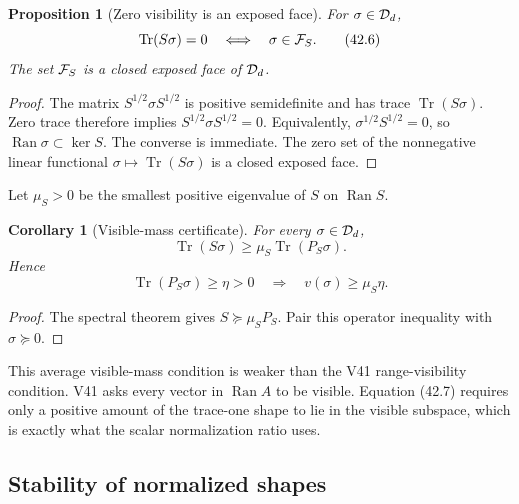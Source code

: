 \documentclass[11pt]{article}
\newtheorem{proposition}[theorem]{Proposition}
\newtheorem{corollary}[theorem]{Corollary}
\theoremstyle{remark}
\begin{document}
\begin{proposition}[Zero visibility is an exposed face]
\label{prop:v12v42-invisible-face}
For \(\sigma\in{\cal D}_d\),
\begin{equation}
 \operatorname{Tr}(S\sigma)=0
 \quad\Longleftrightarrow\quad
 \sigma\in{\cal F}_S.                             \tag{42.6}
\end{equation}
The set \({\cal F}_S\) is a closed exposed face of
\({\cal D}_d\).
\end{proposition}

\begin{proof}
The matrix \(S^{1/2}\sigma S^{1/2}\) is positive semidefinite and
has trace \(\operatorname{Tr}(S\sigma)\).  Zero trace therefore
implies
\(S^{1/2}\sigma S^{1/2}=0\).  Equivalently,
\(\sigma^{1/2}S^{1/2}=0\), so
\(\operatorname{Ran}\sigma\subset\ker S\).  The converse is
immediate.  The zero set of the nonnegative linear functional
\(\sigma\mapsto\operatorname{Tr}(S\sigma)\) is a closed exposed
face.
\end{proof}

Let \(\mu_S>0\) be the smallest positive eigenvalue of \(S\) on
\(\operatorname{Ran}S\).

\begin{corollary}[Visible-mass certificate]
\label{cor:v12v42-visible-mass}
For every \(\sigma\in{\cal D}_d\),
\begin{equation}
 \operatorname{Tr}(S\sigma)
 \geq
 \mu_S\operatorname{Tr}(P_S\sigma).              \tag{42.7}
\end{equation}
Hence
\[
 \operatorname{Tr}(P_S\sigma)\geq\eta>0
 \quad\Longrightarrow\quad
 v(\sigma)\geq\mu_S\eta.
\]
\end{corollary}

\begin{proof}
The spectral theorem gives \(S\succeq\mu_SP_S\).
Pair this operator inequality with \(\sigma\succeq0\).
\end{proof}

This average visible-mass condition is weaker than the V41
range-visibility condition.  V41 asks every vector in
\(\operatorname{Ran}A\) to be visible.  Equation (42.7) requires
only a positive amount of the trace-one shape to lie in the visible
subspace, which is exactly what the scalar normalization ratio uses.

\subsection{Stability of normalized shapes}
\end{document}
